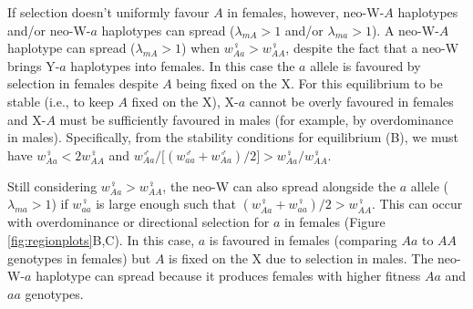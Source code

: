 \documentclass[12pt]{article}
\begin{document}
If selection doesn't uniformly favour $A$ in females, however, neo-W-$A$ haplotypes and/or neo-W-$a$ haplotypes can spread ($\lambda_{mA}>1$ and/or $\lambda_{ma}>1$).
A neo-W-$A$ haplotype can spread ($\lambda_{mA}>1$) when $w_{Aa}^\female>w_{AA}^\female$, despite the fact that a neo-W brings Y-$a$ haplotypes into females.
In this case the $a$ allele is favoured by selection in females despite $A$ being fixed on the X.
For this equilibrium to be stable (i.e.,  to keep $A$ fixed on the X), X-$a$ cannot be overly favoured in females and X-$A$ must be sufficiently favoured in males (for example, by overdominance in males). 
Specifically, from the stability conditions for equilibrium (B), we must have $w_{Aa}^\female < 2 w_{AA}^\female$ and $w_{Aa}^\male/\big[(w_{aa}^\male+w_{Aa}^\male)/2\big]>w_{Aa}^\female/w_{AA}^\female$. 

Still considering $w_{Aa}^\female>w_{AA}^\female$, the neo-W can also spread alongside the $a$ allele ($\lambda_{ma}>1$) if $w_{aa}^\female$ is large enough such that $(w_{Aa}^\female+w_{aa}^\female)/2>w_{AA}^\female$.
This can occur with overdominance or directional selection for $a$ in females (Figure \ref{fig:regionplots}B,C).
In this case, $a$ is favoured in females (comparing $Aa$ to $AA$ genotypes in females) but $A$ is fixed on the X due to selection in males. 
The neo-W-$a$ haplotype can spread because it produces females with higher fitness $Aa$ and $aa$ genotypes. 

\end{document}
